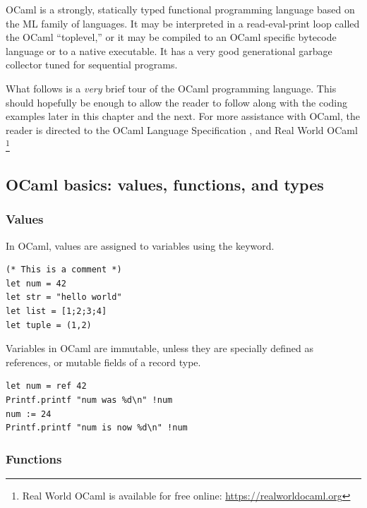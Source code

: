 
OCaml is a strongly, statically typed functional programming language
based on the ML family of languages. It may be interpreted in a
read-eval-print loop called the OCaml ``toplevel,'' or it may be
compiled to an OCaml specific bytecode language or to a native
executable. \cite{ocaml:spec} It has a very good generational garbage
collector tuned for sequential programs. \cite{ocaml:gc_tutorial}

What follows is a \textit{very} brief tour of the OCaml programming
language. This should hopefully be enough to allow the reader to
follow along with the coding examples later in this chapter and the
next. For more assistance with OCaml, the reader is directed to the
OCaml Language Specification \cite{ocaml:spec}, and Real World OCaml
\cite{rwo}\footnote{Real World OCaml is available for free online:
  \url{https://realworldocaml.org}}

\subsection{OCaml basics: values, functions, and types}

\subsubsection{Values}

In OCaml, values are assigned to variables using the 
keyword.

\begin{lstlisting}
(* This is a comment *)
let num = 42
let str = "hello world"
let list = [1;2;3;4]
let tuple = (1,2)
\end{lstlisting}

Variables in OCaml are immutable, unless they are specially defined as
references, or mutable fields of a record type.

\begin{lstlisting}
let num = ref 42
Printf.printf "num was %d\n" !num
num := 24
Printf.printf "num is now %d\n" !num
\end{lstlisting}

\subsubsection{Functions}

